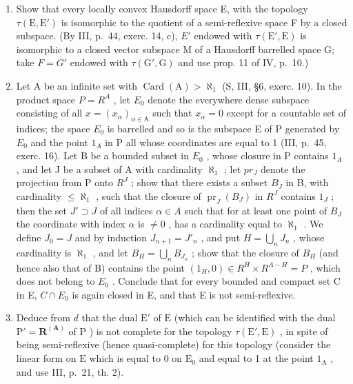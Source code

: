 \begin{enumerate}
\def\labelenumi{\alph{enumi})}
\setcounter{enumi}{2}
\item
  Show that every locally convex Hausdorff space E, with the topology \(\tau(\mathrm{E}, \mathrm{E}')\) is isomorphic to the quotient of a semi-reflexive space F by a closed subspace. (By III, p.~44, exerc. 14, c), \(E'\) endowed with \(\tau(\mathrm{E}', \mathrm{E})\) is isomorphic to a closed vector subspace M of a Hausdorff barrelled space G; take \(F = G'\) endowed with \(\tau(\mathrm{G}', \mathrm{G})\) and use prop. 11 of IV, p.~10.)
\item
  Let A be an infinite set with \(\operatorname{Card}(\mathrm{A}) > \aleph_{1}\) (S, III, §6, exerc. 10). In the product space \(P = R^{A}\) , let \(E_{0}\) denote the everywhere dense subspace consisting of all \(x = (x_{\alpha})_{\alpha \in \mathrm{A}}\) such that \(x_{\alpha} = 0\) except for a countable set of indices; the space \(E_{0}\) is barrelled and so is the subspace E of P generated by \(E_{0}\) and the point \(1_{A}\) in P all whose coordinates are equal to 1 (III, p.~45, exerc. 16). Let B be a bounded subset in \(E_{0}\) , whose closure in P contains \(1_{A}\) , and let J be a subset of A with cardinality \(\aleph_{1}\) ; let \(pr_{J}\) denote the projection from P onto \(R^{J}\) ; show that there exists a subset \(B_{J}\) in B, with cardinality \(\leqslant \aleph_{1}\) , such that the closure of \(\operatorname{pr}_{J}(B_{J})\) in \(R^{J}\) contains \(1_{J}\) ; then the set \(J' \supset J\) of all indices \(\alpha \in A\) such that for at least one point of \(B_{J}\) the coordinate with index \(\alpha\) is \(\neq 0\) , has a cardinality equal to \(\aleph_{1}\) . We define \(J_{0} = J\) and by induction \(J_{n+1} = J'_{n}\) , and put \(H = \bigcup_{n} J_{n}\) , whose cardinality is \(\aleph_{1}\) , and let \(B_{H} = \bigcup_{n} B_{J_{n}}\) ; show that the closure of \(B_{H}\) (and hence also that of B) contains the point \((1_{H}, 0) \in R^{H} \times R^{A-H} = P\) , which does not belong to \(E_{0}\) . Conclude that for every bounded and compact set C in E, \(C \cap E_{0}\) is again closed in E, and that E is not semi-reflexive.
\item
  Deduce from \(d\) that the dual \(\mathrm{E}'\) of \(\mathrm{E}\) (which can be identified with the dual \(\mathrm{P}' = \mathbf{R}^{(\mathbf{A})}\) of \(\mathrm{P}\) ) is not complete for the topology \(\tau (\mathrm{E}',\mathrm{E})\) , in spite of being semi-reflexive (hence quasi-complete) for this topology (consider the linear form on \(\mathrm{E}\) which is equal to 0 on \(\mathrm{E}_0\) and equal to 1 at the point \(1_{\mathrm{A}}\) , and use III, p.~21, th. 2).
\end{enumerate}

